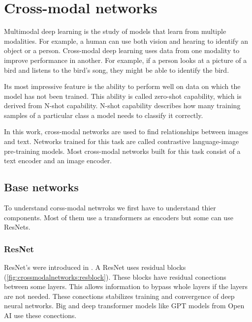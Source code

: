 %
%
%


\chapter{Cross-modal networks
    \label{chapter:crossmodalnetworks}}
    Multimodal deep learning is the study of models that learn from multiple modalities.
    For example, a human can use both vision and hearing to identify an object or a person.
    Cross-modal deep learning uses data from one modality to improve performance in another.
    For example, if a person looks at a picture of a bird and listens to the bird's song, they might be able to identify the bird.
    
    Its most impressive feature is the ability to perform well on data on which the model has not been trained.
    This ability is called zero-shot capability, which is derived from N-shot capability.
    N-shot capability describes how many training samples of a particular class a model needs to classify it correctly.

    In this work, cross-modal networks are used to find relationships between images and text.
    Networks trained for this task are called contrastive language-image pre-training models.
    Most cross-modal networks built for this task consist of a text encoder and an image encoder.

    \section{Base networks}
    To understand corss-modal netwroks we first have to understand thier components.
    Most of them use a transformers as encoders but some can use ResNets.
    
    \subsection{ResNet}
    ResNet's were introduced in \cite{resnetpaper}.
    A ResNet uses residual blocks (\cref{fig:crossmodalnetworks:resblock}).
    These blocks have residual conections between some layers.
    This allows information to bypass whole layers if the layers are not needed.
    These conections stabilizes training and convergence of deep neural networks.
    Big and deep transformer models like GPT models from Open AI use these conections.

